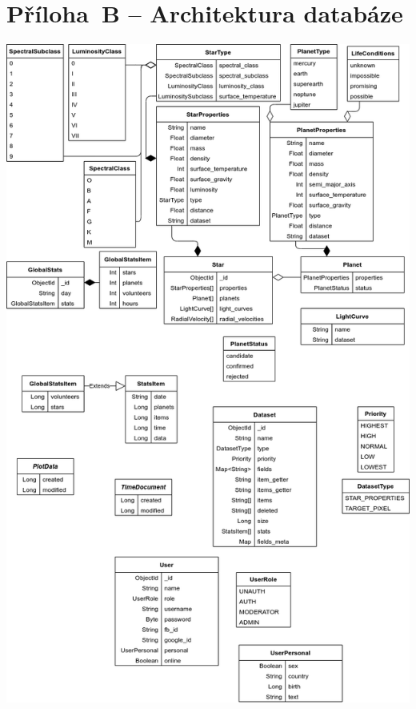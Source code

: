 \documentclass[a4paper,12pt]{article}
\begin{document}
{{{{{{{{{{{{{\section*{Příloha~B -- Architektura databáze}\label{priloha_b}
\includegraphics[width=\linewidth]{img/db.png}

}}}}}}}}}}}}}
\end{document}
